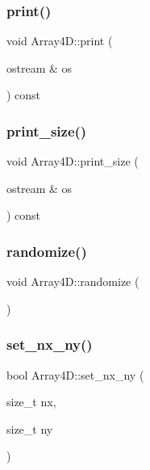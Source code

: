 \subsubsection{\texorpdfstring{print()}{print()}}
{\footnotesize\ttfamily void Array4\+D\+::print (\begin{DoxyParamCaption}\item[{ostream \&}]{os }\end{DoxyParamCaption}) const}

\mbox{\label{class_array4_d_a3a807dbd6c3c0d3f6e79b486549dc9f1}} 
\subsubsection{\texorpdfstring{print\+\_\+size()}{print\_size()}}
{\footnotesize\ttfamily void Array4\+D\+::print\+\_\+size (\begin{DoxyParamCaption}\item[{ostream \&}]{os }\end{DoxyParamCaption}) const}

\mbox{\label{class_array4_d_a15626fe44d3792ccc2822afb30bcbd98}} 
\subsubsection{\texorpdfstring{randomize()}{randomize()}}
{\footnotesize\ttfamily void Array4\+D\+::randomize (\begin{DoxyParamCaption}{ }\end{DoxyParamCaption})}

\mbox{\label{class_array4_d_a4071001d8fd5248bcaf89c54556a6fe2}} 
\subsubsection{\texorpdfstring{set\+\_\+nx\+\_\+ny()}{set\_nx\_ny()}}
{\footnotesize\ttfamily bool Array4\+D\+::set\+\_\+nx\+\_\+ny (\begin{DoxyParamCaption}\item[{size\+\_\+t}]{nx,  }\item[{size\+\_\+t}]{ny }\end{DoxyParamCaption})}

